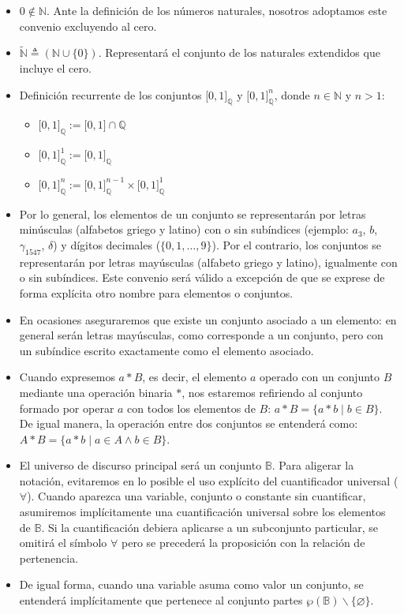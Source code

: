 \begin{itemize}
    \item $0 \notin \mathbb{N}$. Ante la definición de los números naturales, nosotros adoptamos este convenio excluyendo al cero.
    \item $\widetilde{\mathbb{N}} \triangleq \left( \mathbb{N} \cup \{0\} \right)$. Representará el conjunto de los naturales extendidos que incluye el cero.
    \item Definición recurrente de los conjuntos $\lbrack 0,1 \rbrack_{\mathbb{Q}}$ y $\lbrack 0,1 \rbrack_{\mathbb{Q}}^n$, donde $n \in \mathbb{N}$ y $n > 1$:
    \begin{itemize}
        \item $\lbrack 0,1 \rbrack_{\mathbb{Q}} := \lbrack 0,1 \rbrack \cap \mathbb{Q}$
        \item $\lbrack 0,1 \rbrack_{\mathbb{Q}}^1 := \lbrack 0,1 \rbrack_{\mathbb{Q}}$
        \item $\lbrack 0,1 \rbrack_{\mathbb{Q}}^n := \lbrack 0,1 \rbrack_{\mathbb{Q}}^{n-1} \times \lbrack 0,1 \rbrack_{\mathbb{Q}}^1$
    \end{itemize}
    \item Por lo general, los elementos de un conjunto se representarán por letras minúsculas (alfabetos griego y latino) con o sin subíndices (ejemplo: $a_3$, $b$, $\gamma_{1547}$, $\delta$) y dígitos decimales ($\{0, 1, \ldots, 9\}$). Por el contrario, los conjuntos se representarán por letras mayúsculas (alfabeto griego y latino), igualmente con o sin subíndices. Este convenio será válido a excepción de que se exprese de forma explícita otro nombre para elementos o conjuntos.
    \item En ocasiones aseguraremos que existe un conjunto asociado a un elemento: en general serán letras mayúsculas, como corresponde a un conjunto, pero con un subíndice escrito exactamente como el elemento asociado. 
    \item Cuando expresemos $a \ast B$, es decir, el elemento $a$ operado con un conjunto $B$ mediante una operación binaria $\ast$, nos estaremos refiriendo al conjunto formado por operar $a$ con todos los elementos de $B$: $a \ast B = \{ a \ast b \mid b \in B \}$. De igual manera, la operación entre dos conjuntos se entenderá como: $A \ast B = \{ a \ast b \mid a \in A \land b \in B \}$.
    \item El universo de discurso principal será un conjunto $\mathbb{B}$. Para aligerar la notación, evitaremos en lo posible el uso explícito del cuantificador universal ($\forall$). Cuando aparezca una variable, conjunto o constante sin cuantificar, asumiremos implícitamente una cuantificación universal sobre los elementos de $\mathbb{B}$. Si la cuantificación debiera aplicarse a un subconjunto particular, se omitirá el símbolo $\forall$ pero se precederá la proposición con la relación de pertenencia. 
    \item De igual forma, cuando una variable asuma como valor un conjunto, se entenderá implícitamente que pertenece al conjunto partes $\wp(\mathbb{B}) \smallsetminus \{ \varnothing \}$. 
\end{itemize}

